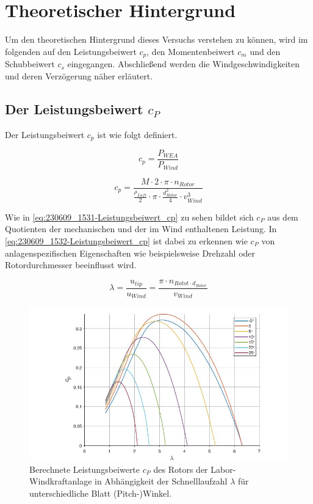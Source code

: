 \section{Theoretischer Hintergrund}
Um den theoretischen Hintergrund dieses Versuchs verstehen zu können, wird im folgenden auf den Leistungsbeiwert $c_{p}$, den Momentenbeiwert $c_{m}$ und den Schubbeiwert $c_{s}$ eingegangen. Abschließend werden die Windgeschwindigkeiten und deren Verzögerung näher erläutert.
\subsection{Der Leistungsbeiwert \texorpdfstring{$c_P$}{}}

Der Leistungsbeiwert $c_{p}$ ist wie folgt definiert.

\begin{equation}
  c_{p}= \frac{P_{WEA}}{P_{Wind}}
    \label{eq:230609_1531-Leistungsbeiwert_cp}
\end{equation}

\begin{equation}
  c_{p}= \frac{M \cdot 2 \cdot \pi \cdot n_{Rotor}}{\frac{\rho_{Luft}}{2}\cdot \pi \cdot \frac{d^2_{Rotor}}{4} \cdot v^3_{Wind} }
    \label{eq:230609_1532-Leistungsbeiwert_cp}
\end{equation}

Wie in \autoref{eq:230609_1531-Leistungsbeiwert_cp} zu sehen bildet sich $c_P$ aus dem Quotienten der mechanischen und der im Wind enthaltenen Leistung. 
In \autoref{eq:230609_1532-Leistungsbeiwert_cp} ist dabei zu erkennen wie $c_P$ von anlagenspezifischen Eigenschaften wie beispielsweise Drehzahl oder Rotordurchmesser beeinflusst wird.

\begin{equation}
\lambda=\frac{u_{tip}}{u_{Wind}}=\frac{\pi \cdot n_{Rotot \cdot d_{Rotor}}}{v_{Wind}}
    \label{eq:Schnelllaufzahl}
\end{equation}

\begin{figure}[H]
    \centering
    \includegraphics[width=1\textwidth]{Abbildungen/cpzulambda.jpg}
    \caption{Berechnete Leistungsbeiwerte $c_P$ des Rotors der Labor-Windkraftanlage in Abhängigkeit der Schnelllaufzahl $\lambda$ für unterschiedliche Blatt (Pitch-)Winkel.\cite{Anleitung}}
    \label{fig:cpzulambda}
\end{figure}

